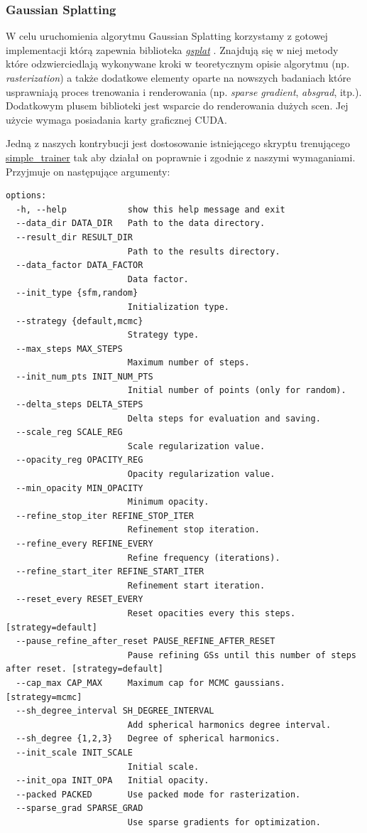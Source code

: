 \subsubsection{Gaussian Splatting}
W celu uruchomienia algorytmu Gaussian Splatting korzystamy z gotowej implementacji którą 
zapewnia biblioteka \href{https://docs.gsplat.studio/main/index.html}{\textit{gsplat}} \cite{ye2024gsplatopensourcelibrarygaussian}. Znajdują się w niej metody które odzwierciedlają wykonywane kroki w teoretycznym opisie algorytmu (np. \textit{rasterization}) a także dodatkowe elementy oparte na nowszych badaniach które usprawniają proces trenowania i renderowania (np. \textit{sparse gradient}, \textit{absgrad}, itp.). Dodatkowym plusem biblioteki jest wsparcie do renderowania dużych scen. Jej użycie wymaga posiadania karty graficznej CUDA.  

Jedną z naszych kontrybucji jest dostosowanie istniejącego skryptu trenującego \href{https://github.com/nerfstudio-project/gsplat/blob/main/examples/simple_trainer.py}{simple\_trainer} tak aby działał on poprawnie i zgodnie z naszymi wymaganiami. Przyjmuje on następujące argumenty:

\lstset{style=basicstyle}
\begin{lstlisting}[language=SHELXL] 
  options:
  -h, --help            show this help message and exit
  --data_dir DATA_DIR   Path to the data directory.
  --result_dir RESULT_DIR
                        Path to the results directory.
  --data_factor DATA_FACTOR
                        Data factor.
  --init_type {sfm,random}
                        Initialization type.
  --strategy {default,mcmc}
                        Strategy type.
  --max_steps MAX_STEPS
                        Maximum number of steps.
  --init_num_pts INIT_NUM_PTS
                        Initial number of points (only for random).
  --delta_steps DELTA_STEPS
                        Delta steps for evaluation and saving.
  --scale_reg SCALE_REG
                        Scale regularization value.
  --opacity_reg OPACITY_REG
                        Opacity regularization value.
  --min_opacity MIN_OPACITY
                        Minimum opacity.
  --refine_stop_iter REFINE_STOP_ITER
                        Refinement stop iteration.
  --refine_every REFINE_EVERY
                        Refine frequency (iterations).
  --refine_start_iter REFINE_START_ITER
                        Refinement start iteration.
  --reset_every RESET_EVERY
                        Reset opacities every this steps. [strategy=default]
  --pause_refine_after_reset PAUSE_REFINE_AFTER_RESET
                        Pause refining GSs until this number of steps after reset. [strategy=default]
  --cap_max CAP_MAX     Maximum cap for MCMC gaussians. [strategy=mcmc]
  --sh_degree_interval SH_DEGREE_INTERVAL
                        Add spherical harmonics degree interval.
  --sh_degree {1,2,3}   Degree of spherical harmonics.
  --init_scale INIT_SCALE
                        Initial scale.
  --init_opa INIT_OPA   Initial opacity.
  --packed PACKED       Use packed mode for rasterization.
  --sparse_grad SPARSE_GRAD
                        Use sparse gradients for optimization.
\end{lstlisting}

